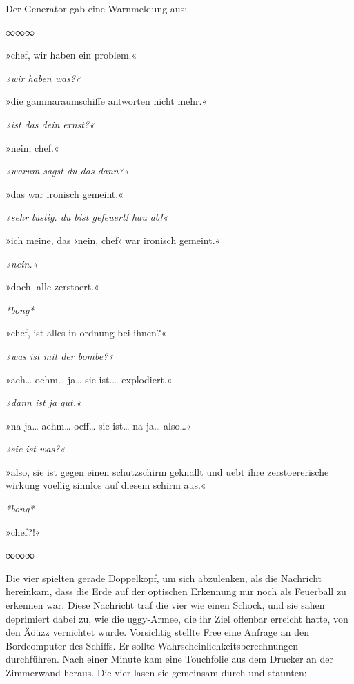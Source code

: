 Der Generator gab eine Warnmeldung aus: 

\begin{center}
    ∞∞∞
\end{center}

»chef, wir haben ein problem.«

\textit{»wir haben was?«}

»die gammaraumschiffe antworten nicht mehr.«

\textit{»ist das dein ernst?«}

»nein, chef.«

\textit{»warum sagst du das dann?«}

»das war ironisch gemeint.«

\textit{»sehr lustig. du bist gefeuert! hau ab!«}

»ich meine, das ›nein, chef‹ war ironisch gemeint.«

\textit{»nein.«}

»doch. alle zerstoert.«

\textit{*bong*}

»chef, ist alles in ordnung bei ihnen?«

\textit{»was ist mit der bombe?«}

»aeh… oehm… ja… sie ist.… explodiert.«

\textit{»dann ist ja gut.«}

»na ja… aehm… oeff… sie ist… na ja… also…«

\textit{»sie ist was?«}

»also, sie ist gegen einen schutzschirm geknallt und uebt ihre zerstoererische wirkung voellig sinnlos auf diesem schirm aus.«

\textit{*bong*}

»chef?!«

\begin{center}
    ∞∞∞
\end{center}

Die vier spielten gerade Doppelkopf, um sich abzulenken, als die Nachricht hereinkam, dass die Erde auf der optischen Erkennung nur noch als Feuerball zu erkennen war. Diese Nachricht traf die vier wie einen Schock, und sie sahen deprimiert dabei zu, wie die uggy-Armee, die ihr Ziel offenbar erreicht hatte, von den Äöüzz vernichtet wurde. Vorsichtig stellte Free eine Anfrage an den Bordcomputer des Schiffs. Er sollte Wahrscheinlichkeitsberechnungen durchführen. Nach einer Minute kam eine Touchfolie aus dem Drucker an der Zimmerwand heraus. Die vier lasen sie gemeinsam durch und staunten:

